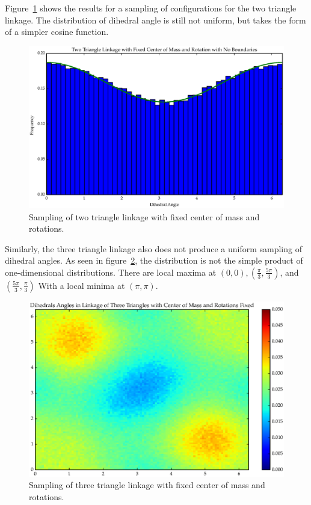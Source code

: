 Figure~\ref{fig:T2_5} shows the results for a sampling of configurations for the two triangle linkage. The distribution of dihedral angle is still not uniform, but takes the form of a simpler cosine function. 
\begin{figure}[ht]
\centering
  \includegraphics[scale=0.6]{images/T2_5.eps}
\caption{Sampling of two triangle linkage with fixed center of mass and rotations.}
\label{fig:T2_5}
\end{figure}
Similarly, the three triangle linkage also does not produce a uniform sampling of dihedral angles. As seen in figure~\ref{fig:T3_6}, the distribution is not the simple product of one-dimensional distributions. There are local maxima at $(0,0), (\frac{\pi}{3}, \frac{5\pi}{3})$, and $(\frac{5\pi}{3}, \frac{\pi}{3})$ With a local minima at $(\pi,\pi)$. 
\begin{figure}[ht]
\centering
  \includegraphics[scale=0.6]{images/T3_6_2D.eps}
\caption{Sampling of three triangle linkage with fixed center of mass and rotations.}
\label{fig:T3_6}
\end{figure}

